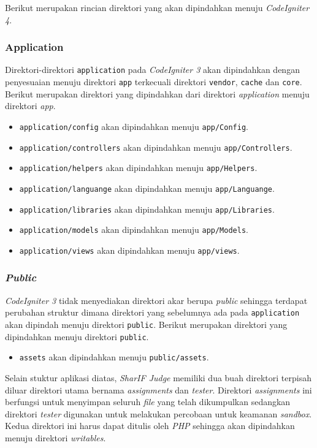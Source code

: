 Berikut merupakan rincian direktori yang akan dipindahkan menuju \textit{CodeIgniter 4}.
\subsubsection{Application}
Direktori-direktori \texttt{application} pada \textit{CodeIgniter 3} akan dipindahkan dengan penyesuaian menuju direktori \texttt{app} terkecuali direktori \texttt{vendor}, \texttt{cache} dan \texttt{core}. Berikut merupakan direktori yang dipindahkan dari direktori \textit{application} menuju direktori \textit{app}.
\begin{itemize}
\item \verb|application/config| akan dipindahkan menuju \texttt{app/Config}.
\item \verb|application/controllers| akan dipindahkan menuju \texttt{app/Controllers}.
\item \verb|application/helpers| akan dipindahkan menuju \texttt{app/Helpers}.
\item \verb|application/languange| akan dipindahkan menuju \texttt{app/Languange}.
\item \verb|application/libraries| akan dipindahkan menuju \texttt{app/Libraries}.
\item \verb|application/models| akan dipindahkan menuju \texttt{app/Models}.
\item \verb|application/views| akan dipindahkan menuju \texttt{app/views}.
\end{itemize}

\subsubsection{\textit{Public}}
\textit{CodeIgniter 3} tidak menyediakan direktori akar berupa \textit{public} sehingga terdapat perubahan struktur dimana direktori yang sebelumnya ada pada \texttt{application} akan dipindah menuju direktori \texttt{public}. Berikut merupakan direktori yang dipindahkan menuju direktori \texttt{public}.
\begin{itemize}
\item \verb|assets| akan dipindahkan menuju \texttt{public/assets}.
\end{itemize}

Selain stuktur aplikasi diatas, \textit{SharIF Judge} memiliki dua buah direktori terpisah diluar direktori utama bernama \textit{assignments} dan \textit{tester}. Direktori \textit{assignments} ini berfungsi untuk menyimpan seluruh \textit{file} yang telah dikumpulkan sedangkan direktori \textit{tester} digunakan untuk melakukan percobaan untuk keamanan \textit{sandbox}. Kedua direktori ini harus dapat ditulis oleh \textit{PHP} sehingga akan dipindahkan menuju direktori \textit{writables}.

